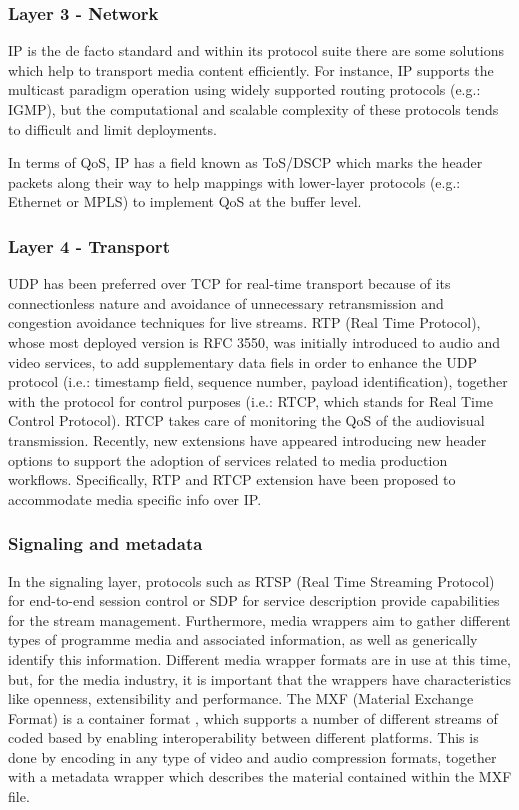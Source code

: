 \subsubsection{Layer 3 - Network}

IP is the de facto standard and within its protocol suite there are some solutions which help to transport media content efficiently. For instance, IP supports the multicast \cite{mc} paradigm operation using widely supported routing protocols (e.g.: IGMP), but the computational and scalable complexity of these protocols tends to difficult and limit deployments.

In terms of QoS, IP has a field known as ToS/DSCP \cite{tosdscp} which marks the header packets along their way to help mappings with lower-layer protocols (e.g.: Ethernet or MPLS) to implement QoS at the buffer level.

\subsubsection{Layer 4 - Transport}

UDP has been preferred over TCP for real-time transport because of its connectionless nature and avoidance of unnecessary retransmission and congestion avoidance techniques for live streams. RTP (Real Time Protocol), whose most deployed version is RFC 3550, was initially introduced to audio and video services, to add supplementary data fiels in order to enhance the UDP protocol (i.e.: timestamp field, sequence number, payload identification), together with the protocol for control purposes (i.e.: RTCP, which stands for Real Time Control Protocol). RTCP takes care of monitoring the QoS of the audiovisual transmission. Recently, new extensions have appeared introducing new header options to support the adoption of services related to media production workflows. Specifically, RTP and RTCP extension have been proposed to accommodate media specific info over IP.

\subsubsection{Signaling and metadata}

In the signaling layer, protocols such as RTSP (Real Time Streaming Protocol) for end-to-end session control or SDP for service description provide capabilities for the stream management. Furthermore, media wrappers aim to gather different types of programme media and associated information, as well as generically identify this information. Different media wrapper formats are in use at this time, but, for the media industry, it is important that the wrappers have characteristics like openness, extensibility and performance. The MXF (Material Exchange Format) is a container format \cite{mxf}, which supports a number of different streams of coded based by enabling interoperability between different platforms. This is done by encoding in any type of video and audio compression formats, together with a metadata wrapper which describes the material contained within the MXF file. 

